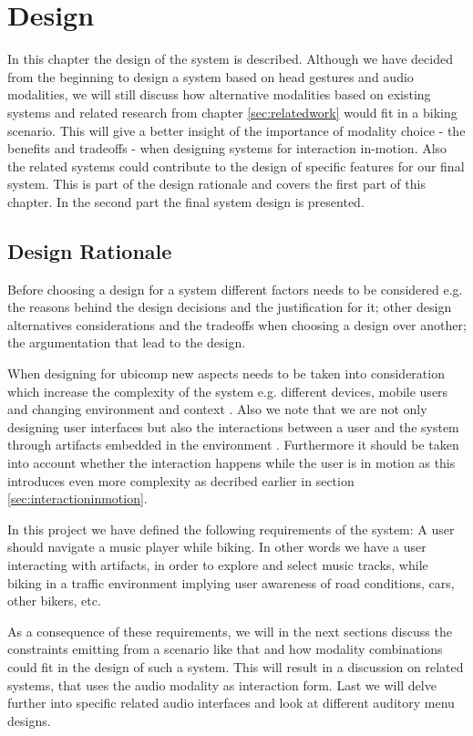 \chapter{Design}
\label{sec:design}
In this chapter the design of the system is described. Although we have decided from the beginning to design a system based on head gestures and audio modalities, we will still discuss how alternative modalities based on existing systems and related research from chapter \ref{sec:relatedwork} would fit in a biking scenario. This will give a better insight of the importance of modality choice - the benefits and tradeoffs - when designing systems for interaction in-motion. Also the related systems could contribute to the design of specific features for our final system. This is part of the design rationale and covers the first part of this chapter. In the second part the final system design is presented.


\section{Design Rationale}
Before choosing a design for a system different factors needs to be considered e.g. the reasons behind the design decisions and the justification for it; other design alternatives considerations and the tradeoffs when choosing a design over another; the argumentation that lead to the design.

When designing for ubicomp new aspects needs to be taken into consideration which increase the complexity of the system e.g. different devices, mobile users and changing environment and context \cite{barfield_fundamentals_2000}. Also we note that we are not only designing user interfaces but also the interactions between a user and the system through artifacts embedded in the environment \cite{beaudouin-lafon_designing_2004}. Furthermore it should be taken into account whether the interaction happens while the user is in motion as this introduces even more complexity as decribed earlier in section \ref{sec:interactioninmotion}.

In this project we have defined the following requirements of the system: A user should navigate a music player while biking. In other words we have a user interacting with artifacts, in order to explore and select music tracks, while biking in a traffic environment implying user awareness of road conditions, cars, other bikers, etc.

As a consequence of these requirements, we will in the next sections discuss the constraints emitting from a scenario like that and how modality combinations could fit in the design of such a system. This will result in a discussion on related systems, that uses the audio modality as interaction form. Last we will delve further into specific related audio interfaces and look at different auditory menu designs.

